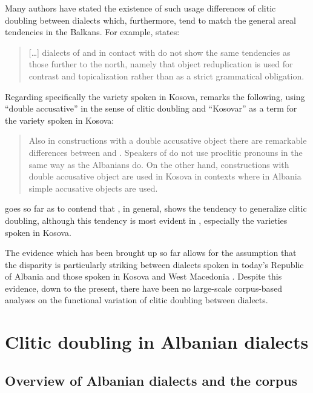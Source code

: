 \documentclass[output=paper]{langsci/langscibook}
\begin{document}
Many authors have stated the existence of such usage differences of clitic doubling between  dialects which, furthermore, tend to match the general areal tendencies in the Balkans. For example, \citet[310]{Curtis2012} states: 
\begin{quote}
[…] dialects of  and  in contact with  do not show the same tendencies as those further to the north, namely that object reduplication is used for contrast and topicalization rather than as a strict grammatical obligation.
\end{quote}
Regarding specifically the  variety spoken in Kosova, \citet[70]{Pani2006} remarks the following, using \enquote{double accusative} in the sense of clitic doubling and \enquote{Kosovar} as a term for the  variety spoken in Kosova:
\begin{quote}
Also in constructions with a double accusative object there are remarkable differences between  and . Speakers of  do not use proclitic pronouns in the same way as the Albanians do. On the other hand, constructions with double accusative object are used in Kosova in contexts where in Albania simple accusative objects are used.
\end{quote}
\citet{Pernaska2012} goes so far as to contend that , in general, shows the tendency to generalize clitic doubling, although this tendency is most evident in , especially the varieties spoken in Kosova. 

The evidence which has been brought up so far allows for the assumption that the disparity is particularly striking between  dialects spoken in today’s Republic of Albania and those spoken in Kosova \parencites{Pani2006}{Pernaska2012} and West Macedonia \citep{Friedman2008}. Despite this evidence, down to the present, there have been no large-scale corpus-based analyses on the functional variation of clitic doubling between  dialects. 

\section{Clitic doubling in Albanian dialects}
\subsection{Overview of Albanian dialects and the corpus}\label{sec:matoshi:3.1}
\end{document}
